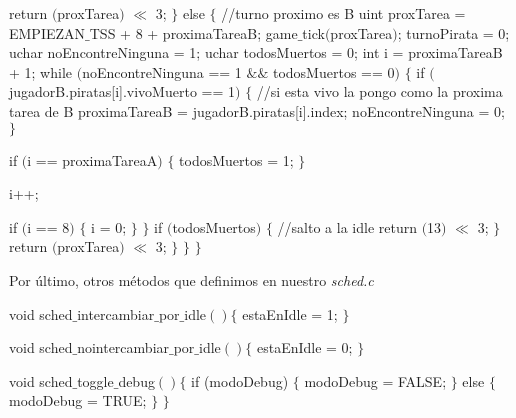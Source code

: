 \begin{algorithmic}
      \State \tab \tab  \tab \tab  return $($proxTarea$)$ $\ll$ 3;
   \State \tab \tab  \tab $\}$ else $\{$
      \State \tab \tab  \tab \tab  //turno proximo es B
      \State \tab \tab  \tab \tab  uint proxTarea = EMPIEZAN$\_$TSS + 8 + proximaTareaB;
      \State \tab \tab  \tab \tab  game$\_$tick$($proxTarea$)$;
      \State \tab \tab  \tab \tab  turnoPirata = 0;
      \State \tab \tab  \tab \tab  uchar noEncontreNinguna = 1;
      \State \tab \tab  \tab \tab  uchar todosMuertos = 0;
      \State \tab \tab  \tab \tab  int i = proximaTareaB + 1;
      \State \tab \tab  \tab \tab  while $($noEncontreNinguna == 1 $\&\&$ todosMuertos == 0$)$ $\{$
    \State \tab \tab  \tab \tab \tab    if $($jugadorB.piratas[i].vivoMuerto == 1$)$ $\{$
          //si esta vivo la pongo como la proxima tarea de B
          \State \tab \tab  \tab \tab \tab \tab proximaTareaB = jugadorB.piratas[i].index;
          \State \tab \tab  \tab \tab \tab \tab noEncontreNinguna = 0;
    \State \tab \tab  \tab \tab \tab    $\}$

    \State \tab \tab  \tab \tab \tab    if $($i == proximaTareaA$)$ $\{$
          \State \tab \tab  \tab \tab \tab \tab todosMuertos = 1;
    \State \tab \tab  \tab \tab \tab    $\}$

    \State \tab \tab  \tab \tab \tab    i++;

     \State \tab \tab  \tab \tab \tab   if $($i == 8$)$ $\{$
          \State \tab \tab  \tab \tab \tab \tab i = 0;
     \State \tab \tab  \tab \tab \tab   $\}$
      \State \tab \tab  \tab \tab $\}$
      \State \tab \tab  \tab \tab if $($todosMuertos$)$ $\{$
        //salto a la idle
        \State \tab \tab  \tab \tab \tab return $($13$)$ $\ll$ 3;
      \State \tab \tab  \tab \tab $\}$
      \State \tab \tab  \tab \tab return $($proxTarea$)$ $\ll$ 3;
\State \tab \tab  \tab    $\}$
\State \tab \tab    $\}$
\State \tab  $\}$
\end{algorithmic}

Por \'ultimo, otros m\'etodos que definimos en nuestro \textit{sched.c}
\begin{algorithmic}
    \State \tab void sched$\_$intercambiar$\_$por$\_$idle$() \{$
        \State \tab \tab estaEnIdle = 1;
    \State \tab $\}$
\end{algorithmic}

\begin{algorithmic}
    \State \tab void sched$\_$nointercambiar$\_$por$\_$idle$() \{$
        \State \tab \tab estaEnIdle = 0;
    \State \tab $\}$
\end{algorithmic}

\begin{algorithmic}
    \State \tab void sched$\_$toggle$\_$debug$() \{$
        \State \tab \tab if (modoDebug) $\{$
        \State \tab \tab \tab modoDebug = FALSE;
        \State \tab \tab $\}$ else $\{$
        \State \tab \tab \tab modoDebug = TRUE;
        \State \tab \tab$\}$
    \State \tab $\}$
\end{algorithmic}
